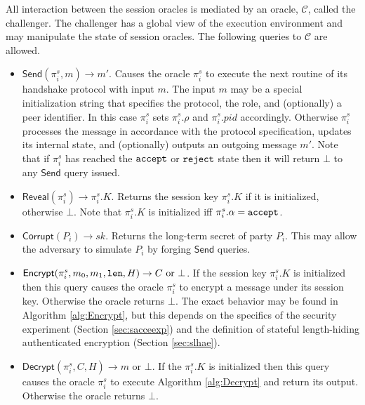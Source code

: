 \documentclass[USenglish,oneside,twocolumn]{article}
\theoremstyle{dgthm}
\theoremstyle{dgdef}
\newcommand{\p}[2]{\pi_{#1}^{#2}}
\newcommand{\Oracle}[1]{\mathcal #1}
\newcommand{\Token}[1]{\textnormal{\tt{#1}}}
\newcommand{\reject}{\Token{reject}}
\newcommand{\accept}{\Token{accept}}
\newcommand{\AdvInt}[1]{\mathsf{#1}}
\newcommand{\Corrupt}{\AdvInt{Corrupt}}
\newcommand{\Reveal}{\AdvInt{Reveal}}
\newcommand{\Send}{\AdvInt{Send}}
\newcommand{\Encrypt}{\AdvInt{Encrypt}}
\newcommand{\Decrypt}{\AdvInt{Decrypt}}
\begin{document}
    All interaction between the session oracles is mediated by an oracle,
    $\Oracle{C}$, called the challenger.  The challenger has a global view of
    the execution environment and may manipulate the state of session oracles.
    The following queries to $\Oracle{C}$ are allowed.
    \begin{itemize}
      \item $\Send(\p{i}{s},m) \rightarrow m'$. Causes the oracle
        $\p{i}{s}$ to execute the next routine of its handshake protocol with
        input $m$. The input $m$ may be a special initialization string that
        specifies the protocol, the role, and (optionally) a peer identifier.
        In this case $\p{i}{s}$ sets $\p{i}{s}.\rho$ and $\p{i}{s}.pid$
        accordingly. Otherwise $\p{i}{s}$ processes the message in accordance
        with the protocol specification, updates its internal state, and
        (optionally) outputs an outgoing message $m'$. Note that if $\p{i}{s}$
        has reached the $\accept$ or $\reject$ state then it will return
        $\bot$ to any $\Send$ query issued.

      \item $\Reveal(\p{i}{s}) \rightarrow \p{i}{s}.K$. Returns the session key
        $\p{i}{s}.K$ if it is initialized, otherwise $\bot$. Note that
        $\p{i}{s}.K$ is initialized iff $\p{i}{s}.\alpha = \accept$.

      \item $\Corrupt(P_i) \rightarrow sk$. Returns the long-term secret of
        party $P_i$. This may allow the adversary to simulate $P_i$ by forging
        $\Send$ queries.

      \item $\Encrypt(\p{i}{s}, m_0, m_1, \Token{len}, H) \rightarrow C \text{~or~} \bot$.
        If the session key $\p{i}{s}.K$ is initialized then this query
        causes the oracle $\p{i}{s}$ to encrypt a message under its session
        key. Otherwise the oracle returns $\bot$. The exact behavior may be
        found in Algorithm \ref{alg:Encrypt}, but this depends on the specifics
        of the security experiment (Section \ref{sec:sacceexp}) and the definition of
        stateful length-hiding authenticated encryption (Section \ref{sec:slhae}).

      \item $\Decrypt(\p{i}{s}, C, H) \rightarrow m \text{~or~} \bot$.
        If the $\p{i}{s}.K$ is initialized then this query
        causes the oracle $\p{i}{s}$ to execute Algorithm \ref{alg:Decrypt} and
        return its output. Otherwise the oracle returns $\bot$.
    \end{itemize}
\end{document}
